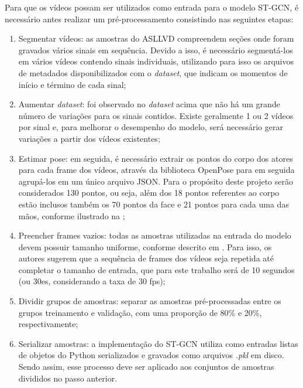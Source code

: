 Para que os vídeos possam ser utilizados como entrada para o modelo ST-GCN, é necessário antes realizar um pré-processamento consistindo nas seguintes etapas:
\begin{enumerate}
    \item Segmentar vídeos: as amostras do  ASLLVD compreendem seções onde foram gravados vários sinais em sequência. Devido a isso, é necessário segmentá-los em vários vídeos contendo sinais individuais, utilizando para isso os arquivos de metadados disponibilizados com o \textit{dataset}, que indicam os momentos de início e término de cada sinal;
    \item Aumentar \textit{dataset}: foi observado no \textit{dataset} acima que não há um grande número de variações para os sinais contidos. Existe geralmente 1 ou 2 vídeos por sinal e, para melhorar o desempenho do modelo, será necessário gerar variações a partir dos vídeos existentes;
    \item Estimar pose: em seguida, é necessário extrair os pontos do corpo dos atores para cada frame dos vídeos, através da biblioteca OpenPose para em seguida agrupá-los em um único arquivo JSON. Para o propósito deste projeto serão considerados 130 pontos, ou seja, além dos 18 pontos referentes ao corpo estão inclusos também os 70 pontos da face e 21 pontos para cada uma das mãos, conforme ilustrado na ;
    \item Preencher frames vazios: todas as amostras utilizadas na entrada do modelo devem possuir tamanho uniforme, conforme descrito em \cite{st-gcn-2018}. Para isso, os autores sugerem que a sequência de frames dos vídeos seja repetida até completar o tamanho de entrada, que para este trabalho será de 10 segundos (ou 30es, considerando a taxa de 30 fps);
    \item Dividir grupos de amostras: separar as amostras pré-processadas entre os grupos treinamento e validação, com uma proporção de 80\% e 20\%, respectivamente;
    \item Serializar amostras: a implementação do ST-GCN utiliza como entradas listas de objetos do Python serializados e gravados como arquivos \textit{.pkl} em disco. Sendo assim, esse processo deve ser aplicado aos conjuntos de amostras divididos no passo anterior.
\end{enumerate}

